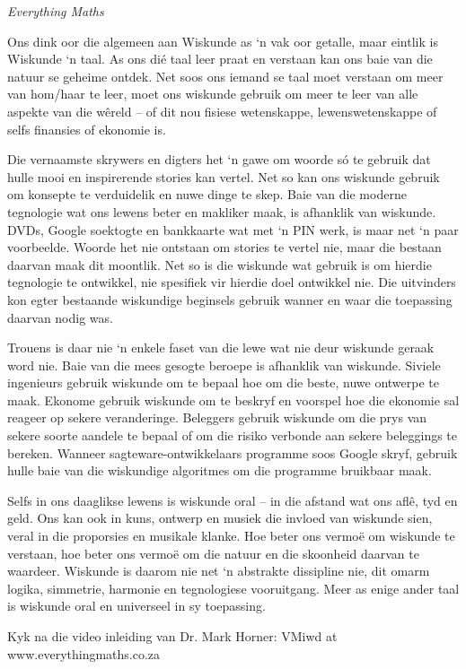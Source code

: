 \newpage
\thispagestyle{empty}

{\normalfont\sffamily\fontsize{22}\normalfont\itshape Everything Maths} \par

{
Ons dink oor die algemeen aan Wiskunde as ‘n vak oor getalle, maar eintlik is Wiskunde ‘n taal. As ons dié taal leer praat en verstaan kan ons baie van die natuur se geheime ontdek. Net soos ons iemand se taal moet verstaan om meer van hom/haar te leer, moet ons wiskunde gebruik om meer te leer van alle aspekte van die wêreld – of dit nou fisiese wetenskappe, lewenswetenskappe of selfs finansies of ekonomie is. \par

Die vernaamste skrywers en digters het ‘n gawe om woorde só te gebruik dat hulle mooi en inspirerende stories kan vertel. Net so kan ons wiskunde gebruik om konsepte te verduidelik en nuwe dinge te skep. Baie van die moderne tegnologie wat ons lewens beter en makliker maak, is afhanklik van wiskunde. DVDs, Google soektogte en bankkaarte wat met ‘n PIN werk, is maar net ‘n paar voorbeelde. Woorde het nie ontstaan om stories te vertel nie, maar die bestaan daarvan maak dit moontlik. Net so is die wiskunde wat gebruik is om hierdie tegnologie te ontwikkel, nie spesifiek vir hierdie doel ontwikkel nie. Die uitvinders kon egter bestaande wiskundige beginsels gebruik wanner en waar die toepassing daarvan nodig was. \par


Trouens is daar nie ‘n enkele faset van die lewe wat nie deur wiskunde geraak word nie. Baie van die mees gesogte beroepe is afhanklik van wiskunde. Siviele ingenieurs gebruik wiskunde om te bepaal hoe om die beste, nuwe ontwerpe te maak. Ekonome gebruik wiskunde om te beskryf en voorspel hoe die ekonomie sal reageer op sekere veranderinge. Beleggers gebruik wiskunde om die prys van sekere soorte aandele te bepaal of om die risiko verbonde aan sekere beleggings te bereken. Wanneer sagteware-ontwikkelaars programme soos Google skryf, gebruik hulle baie van die wiskundige algoritmes om die programme bruikbaar maak.\par

Selfs in ons daaglikse lewens is wiskunde oral – in die afstand wat ons aflê, tyd en geld. Ons kan ook in kuns, ontwerp en musiek die invloed van wiskunde sien, veral in die proporsies en musikale klanke. Hoe beter ons vermoë om wiskunde te verstaan, hoe beter ons vermoë om die natuur en die skoonheid daarvan te waardeer. Wiskunde is daarom nie net ‘n abstrakte dissipline nie, dit omarm logika, simmetrie, harmonie en tegnologiese vooruitgang. Meer as enige ander taal is wiskunde oral en universeel in sy toepassing. \par

Kyk na die video inleiding van Dr. Mark Horner:  VMiwd at www.everythingmaths.co.za

}





